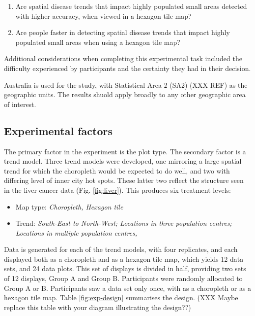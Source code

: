 \documentclass[conference,final,]{IEEEtran}
\providecommand{\tightlist}{%
  \setlength{\itemsep}{0pt}\setlength{\parskip}{0pt}}
\begin{document}
\begin{enumerate}
\def\labelenumi{\arabic{enumi}.}
\tightlist
\item
  Are spatial disease trends that impact highly populated small areas detected with higher accuracy, when viewed in a hexagon tile map?
\item
  Are people faster in detecting spatial disease trends that impact highly populated small areas when using a hexagon tile map?
\end{enumerate}

Additional considerations when completing this experimental task included the difficulty experienced by participants and the certainty they had in their decision.

Australia is used for the study, with Statistical Area 2 (SA2) (XXX REF) as the geographic units. The results shuold apply broadly to any other geographic area of interest.

\hypertarget{experimental-factors}{%
\subsection{Experimental factors}\label{experimental-factors}}

The primary factor in the experiment is the plot type. The secondary factor is a trend model. Three trend models were developed, one mirroring a large spatial trend for which the choropleth would be expected to do well, and two with differing level of inner city hot spots. These latter two reflect the structure seen in the liver cancer data (Fig. \ref{fig:liver}). This produces six treatment levels:

\begin{itemize}
\tightlist
\item
  Map type: \emph{Choropleth, Hexagon tile}
\item
  Trend: \emph{South-East to North-West; Locations in three population centres; Locations in multiple population centres, }
\end{itemize}

Data is generated for each of the trend models, with four replicates, and each displayed both as a choropleth and as a hexagon tile map, which yields 12 data sets, and 24 data plots. This set of displays is divided in half, providing two sets of 12 displays, Group A and Group B. Participants were randomly allocated to Group A or B. Participants saw a data set only once, with as a choropleth or as a hexagon tile map. Table \ref{fig:exp-design} summarises the design. (XXX Maybe replace this table with your diagram illustrating the design??)
\end{document}
